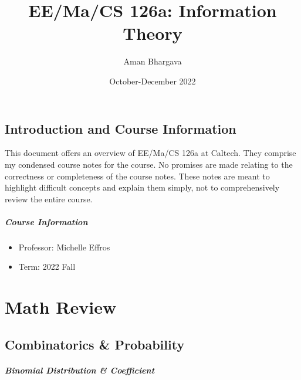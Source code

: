 \documentclass[a4paper,12pt]{report}
\begin{document}
\title{EE/Ma/CS 126a: Information Theory}
\author{Aman Bhargava}
\date{October-December 2022}
\maketitle

\tableofcontents

\section{Introduction and Course Information}

This document offers an overview of EE/Ma/CS 126a at Caltech. They comprise my condensed course notes for the course. No promises are made relating to the correctness or completeness of the course notes. These notes are meant to highlight difficult concepts and explain them simply, not to comprehensively review the entire course.

\paragraph{Course Information}
\begin{itemize}
\item Professor: Michelle Effros
\item Term: 2022 Fall
\end{itemize}





\chapter{Math Review}


\section{Combinatorics \& Probability}

\paragraph{Binomial Distribution \& Coefficient} 
\end{document}
